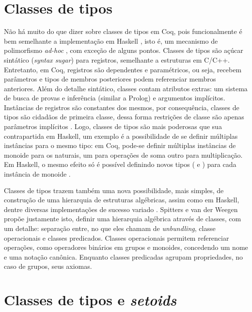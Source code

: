 \section{Classes de tipos}
Não há muito do que dizer sobre classes de tipos em Coq, pois funcionalmente é bem semelhante a implementação em Haskell \cite{Hall1996}, isto é, um mecanismo de polimorfismo \textit{ad-hoc} \cite{Wadler1989}, com exceção de alguns pontos. Classes de tipos são açúcar sintático (\textit{syntax sugar}) para registros, semelhante a estruturas em C/C++. Entretanto, em Coq, registros são dependentes e paramétricos, ou seja, recebem parâmetros e tipos de membros posteriores podem referenciar membros anteriores. Além do detalhe sintático, classes contam atributos extras: um sistema de busca de provas e inferência (similar a Prolog) e argumentos implícitos. Instâncias de registros são constantes dos mesmos, por consequência, classes de tipos são cidadãos de primeira classe, dessa forma restrições de classe são apenas parâmetros implícitos \cite{Sozeau2008}. Logo, classes de tipos são mais poderosas que sua contrapartida em Haskell, um exemplo é a possibilidade de se definir múltiplas instâncias para o mesmo tipo: em Coq, pode-se definir múltiplas instâncias de monoide para os naturais, um para operações de soma outro para multiplicação. Em Haskell, o mesmo efeito só é possível definindo novos tipos ( e ) para cada instância de monoide \cite{HaskellMonoid}.

Classes de tipos trazem também uma nova possibilidade, mais simples, de construção de uma hierarquia de estruturas algébricas, assim como em Haskell, dentre diversas implementações de sucesso variado \cite{Geuvers2002,CruzFilipe2004,Garillot2009,Cohen2020}. Spitters e van der Weegen \cite{Spitters2011} propõe justamente isto, definir uma hierarquia algébrica através de classes, com um detalhe: separação entre, no que eles chamam de \textit{unbundling}, classe operacionais e classes predicados. Classes operacionais permitem referenciar operações, como operadores binários em grupos e monoides, concedendo um nome e uma notação canônica. Enquanto classes predicadas agrupam propriedades, no caso de grupos, seus axiomas. 

\section{Classes de tipos e \textit{setoids}}

